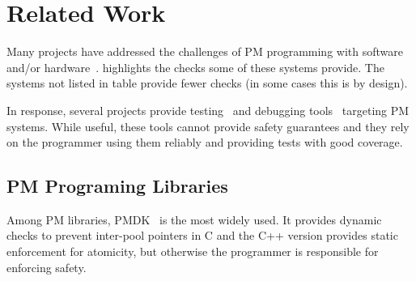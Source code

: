 \section{Related Work}
\label{sec:related}



Many projects have addressed the challenges of PM programming with
software~\cite{pmdk,pronto,mnemosyne,nvheaps,atlas,oracle-nvm-direct,ido,usnap,cohen2018object,
  autopersist,janus,libpm,lazypersist,pisces} and/or
hardware~\cite{ogleari2018steal,Kiln,jeong2018efficient,xu2020hardware}.
 highlights the checks some of these systems provide.  The systems not listed in table
provide fewer checks (in some cases this is by design).

In response, several projects provide
testing~\cite{pmtest,oukid2016testing,xfdetector} and debugging
tools~\cite{intel-pmemcheck,intel-inspector,lantz2014yat} targeting PM systems.
While useful, these tools cannot provide safety guarantees and they rely on the
programmer using them reliably and providing tests with good coverage.

\subsection{PM Programing Libraries}

Among PM libraries, PMDK~\cite{pmdk} is the most widely used.  It provides dynamic checks to prevent inter-pool pointers in C and the C++ version provides static enforcement for atomicity, but otherwise the programmer is responsible for enforcing safety.

